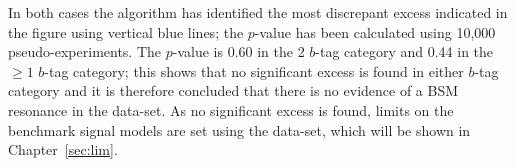 In both cases the \bh{} algorithm has identified the most discrepant excess indicated
in the figure using vertical blue lines;
the \bh{} \mbox{$p$-value} has been calculated using 10,000 pseudo-experiments.
The \bh{} \mbox{$p$-value} is 0.60 in the 2 $b$-tag category
and 0.44 in the $\geq1$ $b$-tag category;
this shows that no significant excess is found in either \mbox{$b$-tag} category and it is therefore concluded
that there is no evidence of a BSM resonance in the \summer{} data-set.
As no significant excess is found, limits on the benchmark signal models are set using the \summer{} data-set,
which will be shown in Chapter~\ref{sec:lim}.


\begin{figure}[!htb]
  \begin{center}
    \captionsetup[subfigure]{aboveskip=0pt,justification=centering}


\end{center}
\end{figure}
